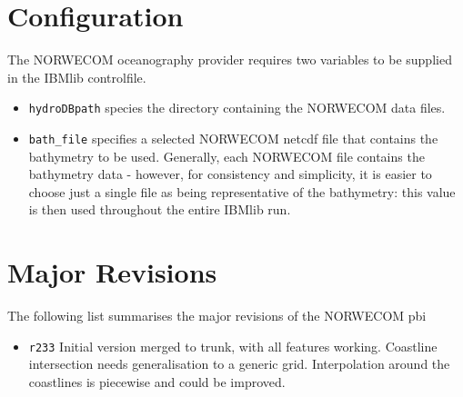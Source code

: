 \documentclass[a4paper,10pt]{article}
\begin{document}
\section{Configuration}
The NORWECOM oceanography provider requires two variables to be supplied in the IBMlib controlfile.\begin{itemize}
 \item \texttt{hydroDBpath} species the directory containing the NORWECOM data files. 
 \item \texttt{bath\_file} specifies a selected NORWECOM netcdf file that contains the bathymetry to be used. Generally, each NORWECOM file contains the bathymetry data - however, for consistency and simplicity, it is easier to choose just a single file as being representative of the bathymetry: this value is then used throughout the entire IBMlib run.
\end{itemize}


\section{Major Revisions}
The following list summarises the major revisions of the NORWECOM pbi
\begin{itemize}
 \item \texttt{r233} Initial version merged to trunk, with all features working. Coastline intersection needs generalisation to a generic grid. Interpolation around the coastlines is piecewise and could be improved.
\end{itemize}
\end{document}
